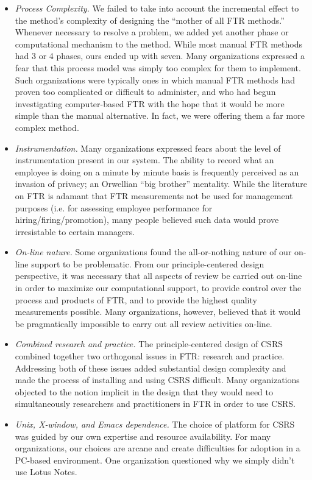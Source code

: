 \begin{itemize}
\item {\em Process Complexity.} We failed to take into account the
  incremental effect to the method's complexity of designing the ``mother
  of all FTR methods.''  Whenever necessary to resolve a problem, we added
  yet another phase or computational mechanism to the method.  While most
  manual FTR methods had 3 or 4 phases, ours ended up with seven.  Many
  organizations expressed a fear that this process model was simply too
  complex for them to implement.  Such organizations were typically ones in
  which manual FTR methods had proven too complicated or difficult to
  administer, and who had begun investigating computer-based FTR with the
  hope that it would be more simple than the manual alternative.  In fact,
  we were offering them a far more complex method.

\item {\em Instrumentation.} Many organizations expressed fears about the
  level of instrumentation present in our system. The ability to record
  what an employee is doing on a minute by minute basis is frequently
  perceived as an invasion of privacy; an Orwellian ``big brother''
  mentality.  While the literature on FTR is adamant that FTR measurements
  not be used for management purposes (i.e. for assessing employee
  performance for hiring/firing/promotion), many people believed such data
  would prove irresistable to certain managers.
  
\item {\em On-line nature.} Some organizations found the all-or-nothing
  nature of our on-line support to be problematic.  From our
  principle-centered design perspective, it was necessary that all aspects
  of review be carried out on-line in order to maximize our computational
  support, to provide control over the process and products of FTR, and to
  provide the highest quality measurements possible.  Many organizations,
  however, believed that it would be pragmatically impossible to carry out
  all review activities on-line. 
  
\item {\em Combined research and practice.} The principle-centered design of
  CSRS combined together two orthogonal issues in FTR: research and
  practice.  Addressing both of these issues added substantial design
  complexity and made the process of installing and using CSRS difficult.
  Many organizations objected to the notion implicit in the design that
  they would need to simultaneously researchers and practitioners in FTR in
  order to use CSRS.
  
\item {\em Unix, X-window, and Emacs dependence.} The choice of platform
  for CSRS was guided by our own expertise and resource availability.  For
  many organizations, our choices are arcane and create difficulties for
  adoption in a PC-based environment.  One organization questioned why we
  simply didn't use Lotus Notes.

\end{itemize}

